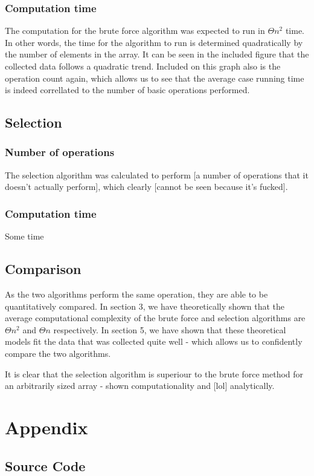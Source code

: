 \documentclass{article}
\begin{document}
        \subsubsection{Computation time}
            The computation for the brute force algorithm was expected to run in $\Theta{n^2}$ time. In other words, the time for the algorithm to run is determined quadratically by the number of elements in the array. It can be seen in the included figure that the collected data follows a quadratic trend. Included on this graph also is the operation count again, which allows us to see that the average case running time is indeed correllated to the number of basic operations performed.
    \subsection{Selection}
        \subsubsection{Number of operations}
            The selection algorithm was calculated to perform [a number of operations that it doesn't actually perform], which clearly [cannot be seen because it's fucked].
        \subsubsection{Computation time}
            Some time


    \subsection{Comparison}
        As the two algorithms perform the same operation, they are able to be quantitatively compared. In section 3, we have theoretically shown that the average computational complexity of the brute force and selection algorithms are $\Theta{n^2}$ and $\Theta{n}$ respectively. In section 5, we have shown that these theoretical models fit the data that was collected quite well - which allows us to confidently compare the two algorithms.

        It is clear that the selection algorithm is superiour to the brute force method for an arbitrarily sized array - shown computationality and [lol] analytically.

\section{Appendix}
    \subsection{Source Code}
\end{document}
